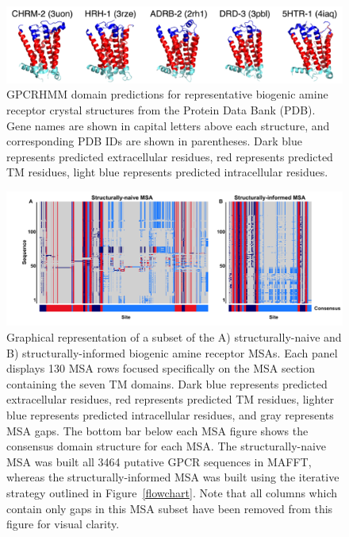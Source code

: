 \documentclass[fleqn,10pt]{wlpeerj}
\begin{document}
\newpage

\begin{figure}[htbp]
	\centerline{\includegraphics[width=15cm]{../figures/pdb_gpcrhmm.png}}
	\caption{\label{pdb_gpcrhmm} GPCRHMM domain predictions for representative biogenic amine receptor crystal structures from the Protein Data Bank (PDB). Gene names are shown in capital letters above each structure, and corresponding PDB IDs are shown in parentheses. Dark blue represents predicted extracellular residues, red represents predicted TM residues, light blue represents predicted intracellular residues.}
\end{figure}



\vspace*{2cm}

\begin{figure}[htbp]
	\centerline{\includegraphics[width=8in]{../figures/domains_naive_struc.png}}
	\caption{\label{domains} Graphical representation of a subset of the A) structurally-naive and B) structurally-informed biogenic amine receptor MSAs. Each panel displays 130 MSA rows focused specifically on the MSA section containing the seven TM domains. Dark blue represents predicted extracellular residues, red represents predicted TM residues, lighter blue represents predicted intracellular residues, and gray represents MSA gaps. The bottom bar below each MSA figure shows the consensus domain structure for each MSA. The structurally-naive MSA was built all 3464 putative GPCR sequences in MAFFT, whereas the structurally-informed MSA was built using the iterative strategy outlined in Figure~\ref{flowchart}. Note that all columns which contain only gaps in this MSA subset have been removed from this figure for visual clarity.}
\end{figure}
\end{document}
